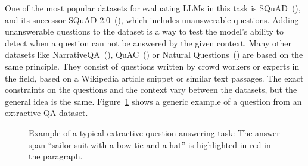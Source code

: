 One of the most popular datasets for evaluating LLMs in this task is SQuAD~(\cite{rajpurkar:2016:SQuAD}), and its successor SQuAD 2.0~(\cite{rajpurkar:2018:Know}), which includes unanswerable questions.
Adding unanswerable questions to the dataset is a way to test the model's ability to detect when a question can not be answered by the given context.
Many other datasets like NarrativeQA~(\cite{kovcisky:2018:The}), QuAC~(\cite{choi:2018:QuAC}) or Natural Questions~(\cite{kwiatkowski:2019:Natural}) are based on the same principle.
They consist of questions written by crowd workers or experts in the field, based on a Wikipedia article snippet or similar text passages.
The exact constraints on the questions and the context vary between the datasets, but the general idea is the same.
Figure~\ref{fig:extractive_qa_example} shows a generic example of a question from an extractive QA dataset.
\begin{figure}[tb]
    \centering
    \caption{Example of a typical extractive question answering task: The answer span ``sailor suit with a bow tie and a hat'' is highlighted in red in the paragraph.}
    \label{fig:extractive_qa_example}
\end{figure}


